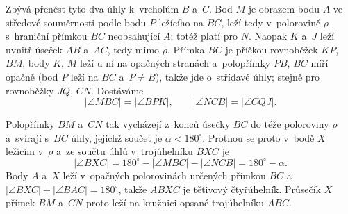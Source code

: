 {    Zbývá přenést tyto dva úhly k~vrcholům $B$ a~$C$. Bod $M$ je obrazem bodu $A$ ve středové souměrnosti podle bodu $P$ ležícího na $BC$, leží tedy v~polorovině $\rho$ s~hraniční přímkou $BC$ neobsahující $A$; totéž platí pro $N$. Naopak $K$ a~$J$ leží uvnitř úseček $AB$ a~$AC$, tedy mimo $\rho$. Přímka $BC$ je příčkou rovnoběžek $KP$, $BM$, body $K$, $M$ leží u ní na opačných stranách a~polopřímky $PB$, $BC$ míří opačně (bod $P$ leží na $BC$ a~$P \neq B$), takže jde o~střídavé úhly; stejně pro rovnoběžky $JQ$, $CN$. Dostáváme
    $$
    |\angle MBC| = |\angle BPK|, \qquad |\angle NCB| = |\angle CQJ|.
    $$

    Polopřímky $BM$ a~$CN$ tak vycházejí z~konců úsečky $BC$ do téže poloroviny $\rho$ a~svírají s~$BC$ úhly, jejichž součet je $\alpha < 180^\circ$. Protnou se proto v~bodě $X$ ležícím v~$\rho$ a~ze součtu úhlů v~trojúhelníku $BXC$ je
    $$
    |\angle BXC| = 180^\circ - |\angle MBC| - |\angle NCB| = 180^\circ - \alpha.
    $$
    Body $A$ a~$X$ leží v~opačných polorovinách určených přímkou $BC$ a $|\angle BXC| + |\angle BAC| = 180^\circ$, takže $ABXC$ je tětivový čtyřúhelník. Průsečík $X$ přímek $BM$ a~$CN$ proto leží na kružnici opsané trojúhelníku $ABC$.
}

